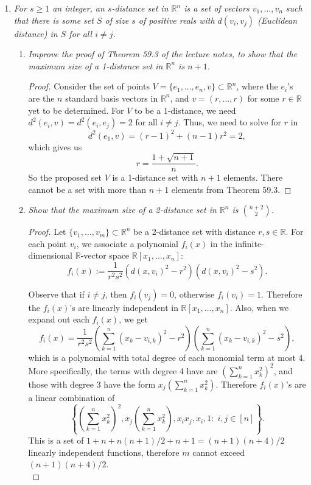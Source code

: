 \documentclass{article}
\begin{document}
\begin{enumerate}
  \item \it For $s\geq1$ an integer, an $s$-distance set in $\mathbb{R}^n$
    is a set of vectors $v_1,\ldots,v_n$ such that there is some set $S$ of
    size $s$ of positive reals with $d(v_i,v_j)$ (Euclidean distance) in
    $S$ for all $i\neq j$.

    \begin{enumerate}
      \item \it Improve the proof of Theorem 59.3 of the lecture notes, to
        show that the maximum size of a 1-distance set in $\mathbb{R}^n$ is
        $n+1$.

        \begin{proof}
          Consider the set of points $V=\{e_1,\ldots,e_n,v\}
          \subset\mathbb{R}^n$, where the $e_i$'s are the $n$ standard
          basis vectors in $\mathbb{R}^n$, and $v=(r,\ldots,r)$ for
          some $r\in\mathbb{R}$ yet to be determined. For $V$ to be a
          1-distance, we need $d^2(e_i,v)=d^2(e_i,e_j)=2$ for all $i\neq
          j$. Thus, we need to solve for $r$ in
          \[d^2(e_1,v) =(r-1)^2 +(n-1)r^2=2,\]
          which gives us
          \[r =\frac{1+\sqrt{n+1}}{n}.\]
          So the proposed set $V$ is a 1-distance set with $n+1$ elements.
          There cannot be a set with more than $n+1$ elements from Theorem
          59.3.
        \end{proof}

      \item \it Show that the maximum size of a 2-distance set in
        $\mathbb{R}^n$ is $\binom{n+2}{2}$.

        \begin{proof}
          Let $\{v_1,\ldots,v_m\} \subset\mathbb{R}^n$ be a 2-distance set
          with distance $r,s\in\mathbb{R}$. For each point $v_i$, we
          associate a polynomial $f_i(x)$ in the infinite-dimensional
          $\mathbb{R}$-vector space $\mathbb{R}[x_1,\ldots,x_n]$:
          \[f_i(x) :=\frac{1}{r^2s^2} (d(x,v_i)^2-r^2)(d(x,v_i)^2-s^2).\]

          Observe that if $i\neq j$, then $f_i(v_j)=0$, otherwise
          $f_i(v_i)=1$. Therefore the $f_i(x)$'s are linearly
          independent in $\mathbb{R}[x_1,\ldots,x_n]$. Also, when we expand
          out each $f_i(x)$, we get
          \[f_i(x) =\frac{1}{r^2s^2} \left(\sum_{k=1}^n (x_k-v_{i,k})^2
          -r^2\right) \left(\sum_{k=1}^n (x_k-v_{i,k})^2 -s^2\right),\]
          which is a polynomial with total degree of each monomial term at
          most 4. More specifically, the terms with degree 4 have are
          $\left(\sum_{k=1}^n x_k^2\right)^2$, and those with degree 3 have
          the form $x_j\left(\sum_{k=1}^n x_k^2\right)$. Therefore
          $f_i(x)$'s are a linear combination of
          \[\left\{\left(\sum_{k=1}^n x_k^2\right)^2, x_j\left(\sum_{k=1}^n
          x_k^2\right), x_ix_j, x_i, 1:\; i,j\in[n] \right\}.\]
          This is a set of $1+n+n(n+1)/2+n+1 =(n+1)(n+4)/2$ linearly
          independent functions, therefore $m$ cannot exceed
          $(n+1)(n+4)/2$. \\


\end{proof}
\end{enumerate}
\end{enumerate}
\end{document}
